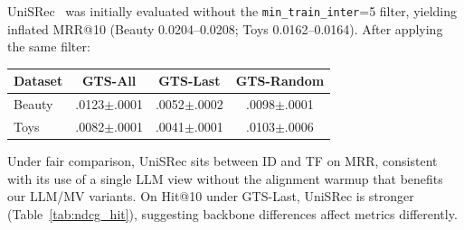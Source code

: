 \documentclass[sigconf,natbib=true,anonymous]{acmart}
\begin{document}
UniSRec~\cite{hou2022unisrec} was initially evaluated without the \texttt{min\_train\_inter}=5 filter, yielding inflated MRR@10 (Beauty 0.0204--0.0208; Toys 0.0162--0.0164).
After applying the same filter:

\begin{table}[h]
\centering
\small
\begin{tabular}{@{}lccc@{}}
\toprule
Dataset & GTS-All & GTS-Last & GTS-Random \\
\midrule
Beauty & .0123$\pm$.0001 & .0052$\pm$.0002 & .0098$\pm$.0001 \\
Toys   & .0082$\pm$.0001 & .0041$\pm$.0001 & .0103$\pm$.0006 \\
\bottomrule
\end{tabular}
\end{table}

Under fair comparison, UniSRec sits between ID and TF on MRR, consistent with its use of a single LLM view without the alignment warmup that benefits our LLM/MV variants.
On Hit@10 under GTS-Last, UniSRec is stronger (Table~\ref{tab:ndcg_hit}), suggesting backbone differences affect metrics differently.
\end{document}
